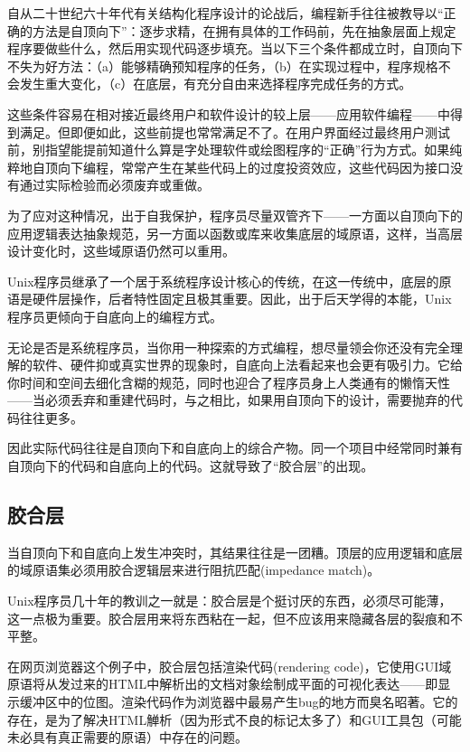 \documentclass[12pt,oneside]{book}
\begin{document}
自从二十世纪六十年代有关结构化程序设计的论战后，编程新手往往被教导以“正确的方法是自顶向下”：逐步求精，在拥有具体的工作码前，先在抽象层面上规定程序要做些什么，然后用实现代码逐步填充。当以下三个条件都成立时，自顶向下不失为好方法：（a）能够精确预知程序的任务，（b）在实现过程中，程序规格不会发生重大变化，（c）在底层，有充分自由来选择程序完成任务的方式。

这些条件容易在相对接近最终用户和软件设计的较上层——应用软件编程——中得到满足。但即便如此，这些前提也常常满足不了。在用户界面经过最终用户测试前，别指望能提前知道什么算是字处理软件或绘图程序的“正确”行为方式。如果纯粹地自顶向下编程，常常产生在某些代码上的过度投资效应，这些代码因为接口没有通过实际检验而必须废弃或重做。

为了应对这种情况，出于自我保护，程序员尽量双管齐下——一方面以自顶向下的应用逻辑表达抽象规范，另一方面以函数或库来收集底层的域原语，这样，当高层设计变化时，这些域原语仍然可以重用。

Unix程序员继承了一个居于系统程序设计核心的传统，在这一传统中，底层的原语是硬件层操作，后者特性固定且极其重要。因此，出于后天学得的本能，Unix程序员更倾向于自底向上的编程方式。

无论是否是系统程序员，当你用一种探索的方式编程，想尽量领会你还没有完全理解的软件、硬件抑或真实世界的现象时，自底向上法看起来也会更有吸引力。它给你时间和空间去细化含糊的规范，同时也迎合了程序员身上人类通有的懒惰天性——当必须丢弃和重建代码时，与之相比，如果用自顶向下的设计，需要抛弃的代码往往更多。

因此实际代码往往是自顶向下和自底向上的综合产物。同一个项目中经常同时兼有自顶向下的代码和自底向上的代码。这就导致了“胶合层”的出现。



\subsection{胶合层}
当自顶向下和自底向上发生冲突时，其结果往往是一团糟。顶层的应用逻辑和底层的域原语集必须用胶合逻辑层来进行阻抗匹配(impedance match)。

Unix程序员几十年的教训之一就是：胶合层是个挺讨厌的东西，必须尽可能薄，这一点极为重要。胶合层用来将东西粘在一起，但不应该用来隐藏各层的裂痕和不平整。

在网页浏览器这个例子中，胶合层包括渲染代码(rendering code)，它使用GUI域原语将从发过来的HTML中解析出的文档对象绘制成平面的可视化表达——即显示缓冲区中的位图。渲染代码作为浏览器中最易产生bug的地方而臭名昭著。它的存在，是为了解决HTML觯析（因为形式不良的标记太多了）和GUI工具包（可能未必具有真正需要的原语）中存在的问题。
\end{document}
